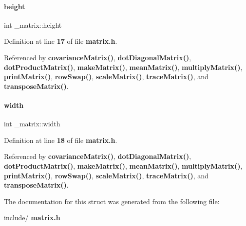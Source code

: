 \mbox{\label{a00183_a8d3b2dbcf98704f11073d646273eb3b0}} 
\paragraph{height}
{\footnotesize\ttfamily int \+\_\+matrix\+::height}



Definition at line \textbf{ 17} of file \textbf{ matrix.\+h}.



Referenced by \textbf{ covariance\+Matrix()}, \textbf{ dot\+Diagonal\+Matrix()}, \textbf{ dot\+Product\+Matrix()}, \textbf{ make\+Matrix()}, \textbf{ mean\+Matrix()}, \textbf{ multiply\+Matrix()}, \textbf{ print\+Matrix()}, \textbf{ row\+Swap()}, \textbf{ scale\+Matrix()}, \textbf{ trace\+Matrix()}, and \textbf{ transpose\+Matrix()}.

\mbox{\label{a00183_a30d055d00e1b4afea4568f2aa1cf5c37}} 
\paragraph{width}
{\footnotesize\ttfamily int \+\_\+matrix\+::width}



Definition at line \textbf{ 18} of file \textbf{ matrix.\+h}.



Referenced by \textbf{ covariance\+Matrix()}, \textbf{ dot\+Diagonal\+Matrix()}, \textbf{ dot\+Product\+Matrix()}, \textbf{ make\+Matrix()}, \textbf{ mean\+Matrix()}, \textbf{ multiply\+Matrix()}, \textbf{ print\+Matrix()}, \textbf{ row\+Swap()}, \textbf{ scale\+Matrix()}, \textbf{ trace\+Matrix()}, and \textbf{ transpose\+Matrix()}.



The documentation for this struct was generated from the following file\+:\begin{DoxyCompactItemize}
\item 
include/\textbf{ matrix.\+h}\end{DoxyCompactItemize}
